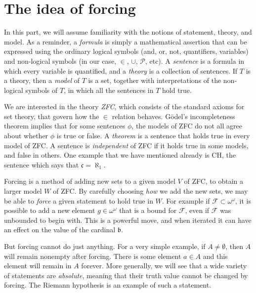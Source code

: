 \documentclass[11pt,oneside]{amsbook}
\theoremstyle{definition}
\theoremstyle{plain}
\theoremstyle{definition}
\theoremstyle{remark}
\numberwithin{equation}{section}
\numberwithin{figure}{section}
\begin{document}
\section{The idea of forcing}
\label{sec:idea-forcing}

In this part, we will assume familiarity with the notions of statement, theory, and model. As a reminder, a \emph{formula} is simply a mathematical assertion that can be expressed using the ordinary logical symbols (and, or, not, quantifiers, variables) and non-logical symbols (in our case, $\in$, $\cup$, $\mathcal P$, etc). A \emph{sentence} is a formula in which every variable is quantified, and a \emph{theory} is a collection of sentences. If $T$ is a theory, then a \emph{model} of $T$ is a set, together with interpretations of the non-logical symbols of $T$, in which all the sentences in $T$ hold true.

We are interested in the theory \emph{ZFC}, which consists of the standard axioms for set theory, that govern how the $\in$ relation behaves. G\"odel's incompleteness theorem implies that for some sentences $\phi$, the models of ZFC do not all agree about whether $\phi$ is true or false. A \emph{theorem} is a sentence that holds true in every model of ZFC. A sentence is \emph{independent} of ZFC if it holds true in some models, and false in others. One example that we have mentioned already is CH, the sentence which says that $\mathfrak c=\aleph_1$.


Forcing is a method of adding new sets to a given model $V$ of ZFC, to obtain a larger model $W$ of ZFC. By carefully choosing \emph{how} we add the new sets, we may be able to \emph{force} a given statement to hold true in $W$. For example if $\mathcal F\subset\omega^\omega$, it is possible to add a new element $g\in\omega^\omega$ that is a bound for $\mathcal F$, even if $\mathcal F$ was unbounded to begin with. This is a powerful move, and when iterated it can have an effect on the value of the cardinal $\mathfrak b$.

But forcing cannot do just anything. For a very simple example, if $A\neq\emptyset$, then $A$ will remain nonempty after forcing. There is some element $a\in A$ and this element will remain in $A$ forever. More generally, we will see that a wide variety of statements are \emph{absolute}, meaning that their truth value cannot be changed by forcing. The Riemann hypothesis is an example of such a statement.
\end{document}
